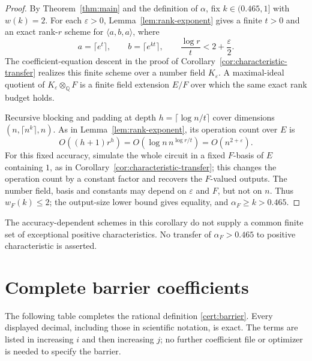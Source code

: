 \documentclass[11pt]{article}
\numberwithin{equation}{section}
\theoremstyle{definition}
\theoremstyle{remark}
\begin{document}
\begin{proof}
By Theorem~\ref{thm:main} and the definition of \(\alpha\), fix
\(k\in(0.465,1]\) with \(w(k)=2\).  For each \(\varepsilon>0\),
Lemma~\ref{lem:rank-exponent} gives a finite \(t>0\) and an exact
rank-\(r\) scheme for \(\langle a,b,a\rangle\), where
\[
 a=\lceil e^t\rceil,\qquad b=\lceil e^{kt}\rceil,\qquad
 \frac{\log r}{t}<2+\frac{\varepsilon}{2}.
\]
The coefficient-equation descent in the proof of
Corollary~\ref{cor:characteristic-transfer} realizes this finite scheme
over a number field \(K_{\varepsilon}\).  A maximal-ideal quotient of
\(K_{\varepsilon}\otimes_{\mathbb Q}F\) is a finite field extension
\(E/F\) over which the same exact rank budget holds.

Recursive blocking and padding at depth \(h=\lceil\log n/t\rceil\)
cover dimensions \((n,\lceil n^k\rceil,n)\).  As in
Lemma~\ref{lem:rank-exponent}, its operation count over \(E\) is
\[
 O((h+1)r^h)=O\!\left(\log n\,n^{\log r/t}\right)
             =O(n^{2+\varepsilon}).
\]
For this fixed accuracy, simulate the whole circuit in a fixed
\(F\)-basis of \(E\) containing \(1\), as in
Corollary~\ref{cor:characteristic-transfer}; this changes the operation
count by a constant factor and recovers the \(F\)-valued outputs.
The number field, basis and constants may depend on \(\varepsilon\)
and \(F\), but not on \(n\).  Thus \(w_F(k)\le2\); the output-size
lower bound gives equality, and \(\alpha_F\ge k>0.465\).
\end{proof}

The accuracy-dependent schemes in this corollary do not supply a common
finite set of exceptional positive characteristics.  No transfer of
\(\alpha_F>0.465\) to positive characteristic is asserted.

\appendix
\section{Complete barrier coefficients}
\label{cert:coefficients}

The following table completes the rational definition
\eqref{cert:barrier}.  Every displayed decimal, including those in
scientific notation, is exact.  The terms are listed in increasing $i$
and then increasing $j$; no further coefficient file or optimizer is
needed to specify the barrier.
\end{document}
